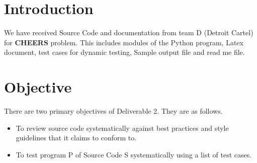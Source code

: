 \section{Introduction}
 We have received Source Code and documentation from team D (Detroit Cartel) for \textbf {CHEERS} problem. This includes modules of the Python program, Latex document, test cases for dynamic testing, Sample output file and read me file. 
 \section{Objective}

 There are two primary objectives of Deliverable 2. They are as follows.
 \begin{itemize}
    \item To review source code systematically against best practices and style guidelines that it claims to conform to.
    \item To test program P of Source Code S systematically using a list of test cases.
 \end{itemize}
   